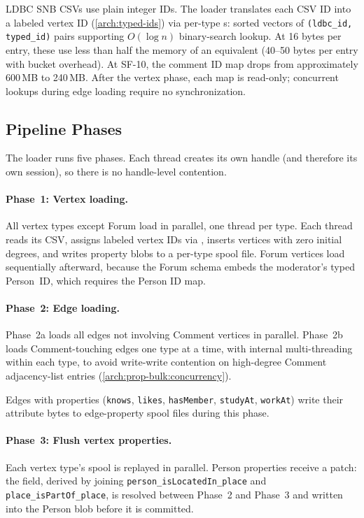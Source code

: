 LDBC SNB CSVs use plain integer IDs.
The loader translates each CSV ID into a labeled vertex ID (\autoref{arch:typed-ids}) via per-type s: sorted vectors of \texttt{(ldbc\_id, typed\_id)} pairs supporting $O(\log n)$ binary-search lookup.
At 16 bytes per entry, these use less than half the memory of an equivalent  (40--50 bytes per entry with bucket overhead).
At SF-10, the comment ID map drops from approximately 600\,MB to 240\,MB.
After the vertex phase, each map is read-only; concurrent lookups during edge loading require no synchronization.

\subsection{Pipeline Phases}
\label{arch:prop-bulk:phases}

The loader runs five phases.
Each thread creates its own  handle (and therefore its own \wt{} session), so there is no handle-level contention.

\paragraph{Phase~1: Vertex loading.}
All vertex types except Forum load in parallel, one thread per type.
Each thread reads its CSV, assigns labeled vertex IDs via , inserts vertices with zero initial degrees, and writes property blobs to a per-type spool file.
Forum vertices load sequentially afterward, because the Forum schema embeds the moderator's typed Person~ID, which requires the Person ID map.

\paragraph{Phase~2: Edge loading.}
Phase~2a loads all edges not involving Comment vertices in parallel.
Phase~2b loads Comment-touching edges one type at a time, with internal multi-threading within each type, to avoid write-write contention on high-degree Comment adjacency-list entries (\autoref{arch:prop-bulk:concurrency}).

Edges with properties (\texttt{knows}, \texttt{likes}, \texttt{hasMember}, \texttt{studyAt}, \texttt{workAt}) write their attribute bytes to edge-property spool files during this phase.

\paragraph{Phase~3: Flush vertex properties.}
Each vertex type's spool is replayed in parallel.
Person properties receive a patch: the  field, derived by joining \texttt{person\_isLocatedIn\_place} and \texttt{place\_isPartOf\_place}, is resolved between Phase~2 and Phase~3 and written into the Person blob before it is committed.

